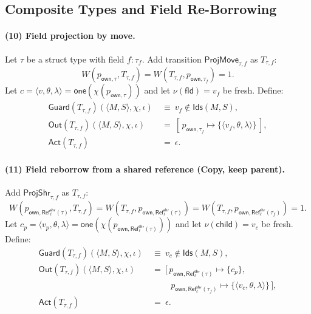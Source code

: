 \documentclass[runningheads]{llncs}
\begin{document}
\subsection{Composite Types and Field Re-Borrowing}
\label{sec:method:composite}

\paragraph{(10) Field projection by move.}
Let $\tau$ be a struct type with field $f:\tau_f$.
Add transition $\mathsf{ProjMove}_{\tau,f}$ as $T_{\tau,f}$: 
\begin{equation*}
W(p_{\mathsf{own},\tau},T_{\tau,f})=W(T_{\tau,f},p_{\mathsf{own},\tau_f})=1.
\end{equation*}
Let $c=\langle v,\theta,\lambda\rangle=\mathsf{one}(\chi(p_{\mathsf{own},\tau}))$ and let $\nu(\mathsf{fld})=v_f$ be fresh.
Define:
\begin{align*}
\mathsf{Guard}(T_{\tau,f})(\langle M,S\rangle,\chi,\iota)
&~\equiv~ v_f\notin \mathsf{Ids}(M,S),\\
\mathsf{Out}(T_{\tau,f})(\langle M,S\rangle,\chi,\iota)
&~=~ [\,p_{\mathsf{own},\tau_f}\mapsto \{\langle v_f,\theta,\lambda\rangle\}\,],\\
\mathsf{Act}(T_{\tau,f})
&~=~ \epsilon.
\end{align*}

\paragraph{(11) Field reborrow from a shared reference (Copy, keep parent).}
Add $\mathsf{ProjShr}_{\tau,f}$ as $T_{\tau,f}$:
\begin{equation*}
    W(p_{\mathsf{own},\mathsf{Ref}^{\mathsf{shr}}_{\ell}(\tau)},T_{\tau,f})=
    W(T_{\tau,f},p_{\mathsf{own},\mathsf{Ref}^{\mathsf{shr}}_{\ell}(\tau)})=
    W(T_{\tau,f},p_{\mathsf{own},\mathsf{Ref}^{\mathsf{shr}}_{\ell}(\tau_f)})=1.
\end{equation*}
Let $c_p=\langle v_p,\theta,\lambda\rangle=\mathsf{one}(\chi(p_{\mathsf{own},\mathsf{Ref}^{\mathsf{shr}}_{\ell}(\tau)}))$
and let $\nu(\mathsf{child})=v_c$ be fresh. Define:
\begin{align*}
\mathsf{Guard}(T_{\tau,f})(\langle M,S\rangle,\chi,\iota)
&~\equiv~ v_c\notin \mathsf{Ids}(M,S),\\
\mathsf{Out}(T_{\tau,f})(\langle M,S\rangle,\chi,\iota)
&~=~ [\,p_{\mathsf{own},\mathsf{Ref}^{\mathsf{shr}}_{\ell}(\tau)}\mapsto \{c_p\},\\
&\qquad\ \ p_{\mathsf{own},\mathsf{Ref}^{\mathsf{shr}}_{\ell}(\tau_f)}\mapsto \{\langle v_c,\theta,\lambda\rangle\}\,],\\
\mathsf{Act}(T_{\tau,f})
&~=~ \epsilon.
\end{align*}
\end{document}

